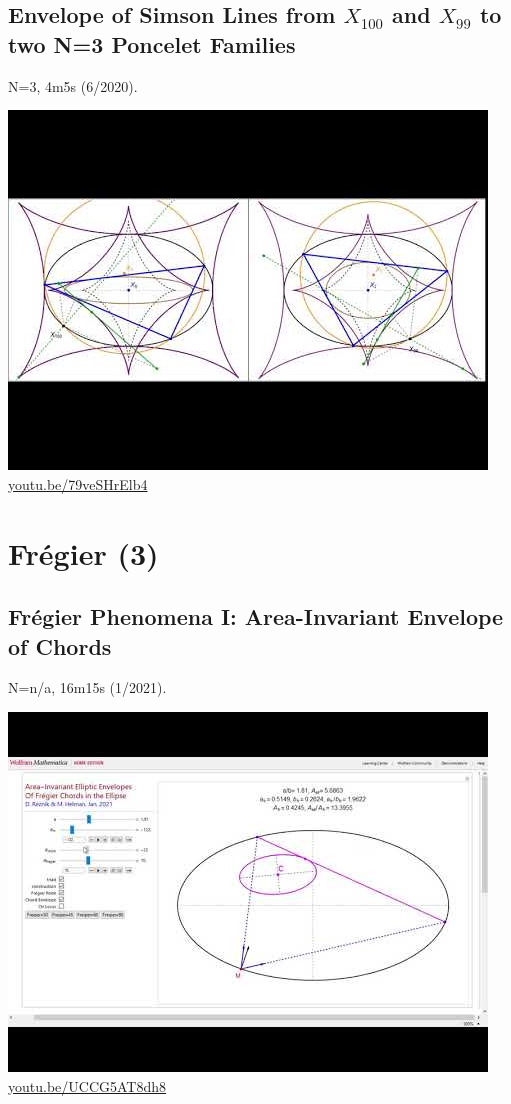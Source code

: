 \documentclass[12pt]{amsart}
\begin{document}
\subsection{Envelope of Simson Lines from $X_{100}$ and $X_{99}$ to two N=3 Poncelet Families}
\label{vid:79veSHrElb4}
\noindent N=3, 4m5s (6/2020). 
\begin{center}\includegraphics[width=.5\textwidth]{pics/79veSHrElb4.jpg} \\ 
\href{https://youtu.be/79veSHrElb4}{\url{youtu.be/79veSHrElb4}}\end{center}
% 


\section{Frégier (3)}

\subsection{Frégier Phenomena I: Area-Invariant Envelope of Chords}
\label{vid:UCCG5AT8dh8}
\noindent N=n/a, 16m15s (1/2021). 
\begin{center}\includegraphics[width=.5\textwidth]{pics/UCCG5AT8dh8.jpg} \\ 
\href{https://youtu.be/UCCG5AT8dh8}{\url{youtu.be/UCCG5AT8dh8}}\end{center}
% 
\end{document}

